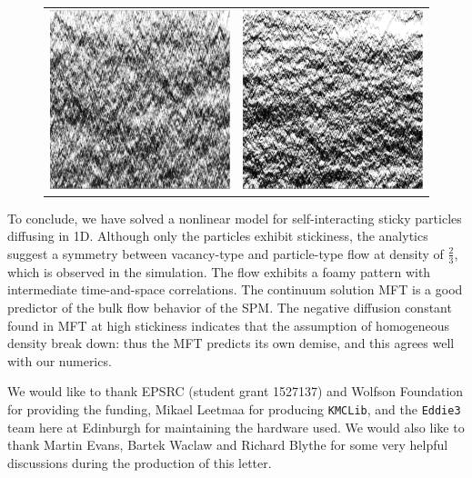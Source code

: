 \documentclass[
reprint,
 amsmath,amssymb,
 aps,
 prl
]{revtex4-1}
\begin{document}
\begin{figure}[h!]
\begin{center}
\begin{tabular}{c | c}
    \includegraphics[width=0.49\linewidth]{longTime} &\includegraphics[width=0.49\linewidth]{midLongTime}
    \end{tabular}
\end{center}
    \vspace{-2em}
\end{figure}


To conclude, we have solved a nonlinear model for self-interacting sticky particles diffusing in 1D.  Although only the particles exhibit stickiness,  the analytics suggest a symmetry between vacancy-type and particle-type flow
at density of $\frac{2}{3}$, which is observed in the simulation.  The flow exhibits a foamy pattern with intermediate time-and-space correlations.  The continuum solution MFT is a good predictor of the bulk flow behavior of the SPM.
The negative diffusion constant found in MFT at high stickiness indicates  that the assumption of homogeneous density break down: thus the MFT predicts its own demise, and this agrees well with our numerics.

We would like to thank EPSRC (student grant 1527137) and Wolfson Foundation for providing the funding, Mikael Leetmaa for producing \texttt{KMCLib}, and the \texttt{Eddie3} team here at Edinburgh for maintaining the hardware used.
We would also like to thank Martin Evans, Bartek Waclaw and Richard Blythe for some very helpful discussions during the production of this letter.



\newpage
\end{document}
